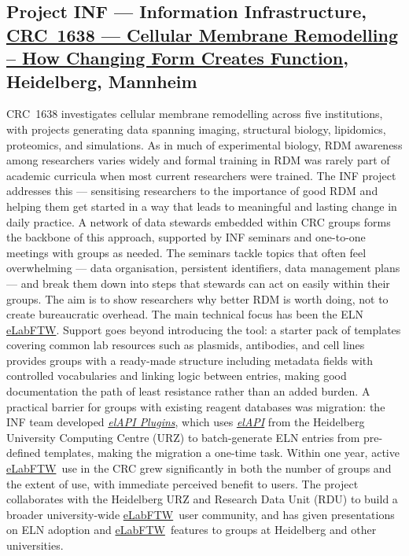 \documentclass{eceasst}
\newcommand{\elabftw}{\href{https://www.elabftw.net/}{eLabFTW}}
\begin{document}
\subsection{Project INF --- Information Infrastructure, \href{https://www.sfb1638.de/}{CRC~1638 --- Cellular Membrane Remodelling -- How Changing Form Creates Function}, Heidelberg, Mannheim}
CRC~1638 investigates cellular membrane remodelling across five institutions, with projects generating data spanning imaging, structural biology, lipidomics, proteomics, and simulations.
As in much of experimental biology, RDM awareness among researchers varies widely and formal training in RDM was rarely part of academic curricula when most current researchers were trained.
The INF project addresses this --- sensitising researchers to the importance of good RDM and helping them get started in a way that leads to meaningful and lasting change in daily practice.
A network of data stewards embedded within CRC groups forms the backbone of this approach, supported by INF seminars and one-to-one meetings with groups as needed.
The seminars tackle topics that often feel overwhelming --- data organisation, persistent identifiers, data management plans --- and break them down into steps that stewards can act on easily within their groups.
The aim is to show researchers why better RDM is worth doing, not to create bureaucratic overhead.
The main technical focus has been the ELN \elabftw.
Support goes beyond introducing the tool: a starter pack of templates covering common lab resources such as plasmids, antibodies, and cell lines provides groups with a ready-made structure including metadata fields with controlled vocabularies and linking logic between entries, making good documentation the path of least resistance rather than an added burden.
A practical barrier for groups with existing reagent databases was migration: the INF team developed \href{https://github.com/sfb1638/elAPI\_Plugins}{\textit{elAPI Plugins}}, which uses \href{https://github.com/uhd-urz/elAPI}{\textit{elAPI}} from the Heidelberg University Computing Centre (URZ) to batch-generate ELN entries from pre-defined templates, making the migration a one-time task.
Within one year, active \elabftw~use in the CRC grew significantly in both the number of groups and the extent of use, with immediate perceived benefit to users.
The project collaborates with the Heidelberg URZ and Research Data Unit (RDU) to build a broader university-wide \elabftw~user community, and has given presentations on ELN adoption and \elabftw~features to groups at Heidelberg and other universities.
\end{document}
